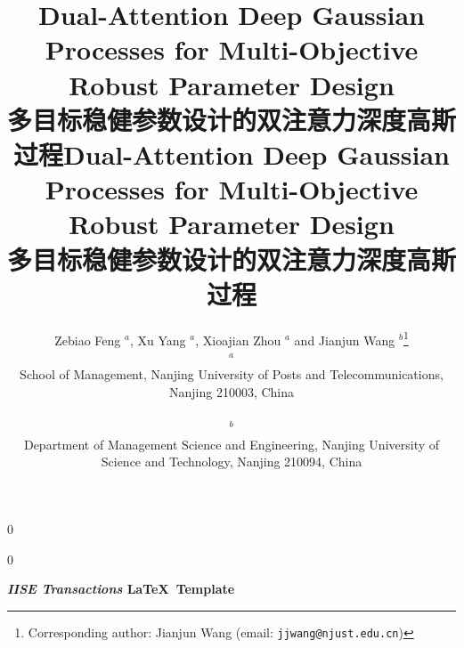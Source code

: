 \documentclass[11pt]{article}
\newcommand{\blind}{0}
\begin{document}
		
		\def\spacingset#1{\renewcommand{\baselinestretch}%
			{#1}\small\normalsize} \spacingset{1}
		
	\blind
	{
		\title{Dual-Attention Deep Gaussian Processes for Multi-Objective Robust Parameter Design\\多目标稳健参数设计的双注意力深度高斯过程}
		\maketitle
	} \fi
	
		
		\blind
		{

            \title{Dual-Attention Deep Gaussian Processes for Multi-Objective Robust Parameter Design\\多目标稳健参数设计的双注意力深度高斯过程}
			\author{Zebiao Feng $^a$, Xu Yang $^a$, Xioajian Zhou $^a$ and Jianjun Wang $^b$\thanks{Corresponding author: Jianjun Wang (email: \texttt{jjwang@njust.edu.cn})} \\
				$^a$ \parbox{1\textwidth}{School of Management, Nanjing University of Posts and Telecommunications, Nanjing 210003, China} \\
				$^b$ \parbox{1\textwidth}{Department of Management Science and Engineering, Nanjing University of Science and Technology, Nanjing 210094, China}}
			
\bigskip
			\bigskip
			\bigskip
			\begin{center}
				{\LARGE\bf \emph{IISE Transactions} \LaTeX \ Template}
			\end{center}
			\medskip
		} \fi
		\bigskip
		
\end{document}
